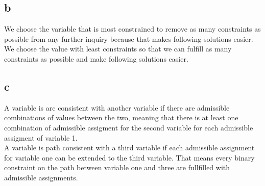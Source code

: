 \documentclass[a4paper]{article}
\begin{document}
\subsection*{b}
We choose the variable that is most constrained to remove as many constraints as possible from any further inquiry because that makes following solutions easier. \\
We choose the value with least constraints so that we can fulfill as many constraints as possible and make following solutions easier.

\subsection*{c}
A variable is arc consistent with another variable if there are admissible combinations of values between the two, meaning that there is at least one combination of admissible assigment for the second variable for each admissible assigment of variable 1. \\
A variable is path consistent with a third variable if each admissible assignment for variable one can be extended to the third variable. That means every binary constraint on the path between variable one and three are fullfilled with admissible assignments.
\end{document}
